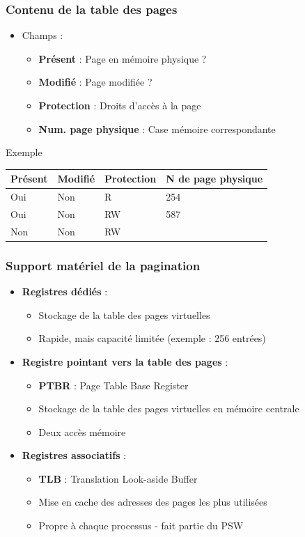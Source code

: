 \begin{frame}
\frametitle{Contenu de la table des pages}
\begin{itemize}
\item Champs :
\begin{itemize}
\item \textbf{Présent} : Page en mémoire physique ?
\item \textbf{Modifié} : Page modifiée ?
\item \textbf{Protection} : Droits d'accès à la page
\item \textbf{Num. page physique} : Case mémoire correspondante
\end{itemize}
\end{itemize}
\begin{block}{Exemple}
\begin{tabular}{l|l|l|l}
Présent & Modifié & Protection & N de page physique \\
\hline
Oui & Non & R & 254 \\
Oui & Non & RW & 587 \\
Non & Non & RW & \\
\end{tabular}
\end{block}
\end{frame}

\begin{frame}
\frametitle{Support matériel de la pagination}
\begin{itemize}
\item <1>\textbf{Registres dédiés} :
\begin{itemize}
\item Stockage de la table des pages virtuelles
\item Rapide, mais capacité limitée (exemple : 256 entrées)
\end{itemize}
\item <2>\textbf{Registre pointant vers la table des pages} :
\begin{itemize}
\item \textbf{PTBR} : Page Table Base Register
\item Stockage de la table des pages virtuelles en mémoire centrale
\item Deux accès mémoire
\end{itemize}
\item <3>\textbf{Registres associatifs} :
\begin{itemize}
\item \textbf{TLB} : Translation Look-aside Buffer
\item Mise en cache des adresses des pages les plus utilisées
\item Propre à chaque processus - fait partie du PSW
\end{itemize}
\end{itemize}
\end{frame}


